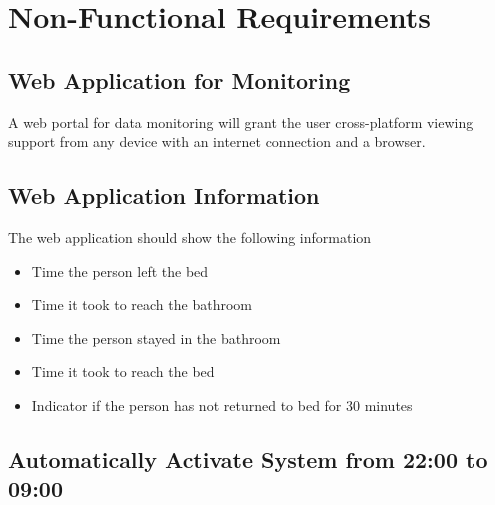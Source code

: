 \newpage
\section{Non-Functional Requirements}
\subsection{Web Application for Monitoring}
    A web portal for data monitoring will grant the user cross-platform viewing support from any device with an internet connection and a browser.
    
\subsection{Web Application Information}
    The web application should show the following information
    \begin{itemize}
        \item Time the person left the bed
        \item Time it took to reach the bathroom
        \item Time the person stayed in the bathroom
        \item Time it took to reach the bed
        \item Indicator if the person has not returned to bed for 30 minutes
    \end{itemize}
    
\subsection{Automatically Activate System from 22:00 to 09:00}
    
\printbibliography


